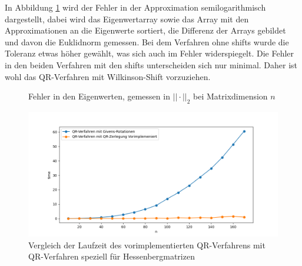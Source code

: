 \documentclass{article}
\theoremstyle{plain}
\begin{document}
In Abbildung \ref{Error_QR} wird der Fehler in der Approximation semilogarithmisch dargestellt, dabei wird das Eigenwertarray sowie das Array mit den Approximationen an die Eigenwerte sortiert, die Differenz der Arrays gebildet und davon die Euklidnorm gemessen. Bei dem Verfahren ohne shifts wurde die Toleranz etwas höher gewählt, was sich auch im Fehler widerspiegelt. Die Fehler in den beiden Verfahren mit den shifts unterscheiden sich nur minimal. Daher ist wohl das QR-Verfahren mit Wilkinson-Shift vorzuziehen.


\begin{figure}[H]
  \centering
  \qquad
  \caption{Fehler in den Eigenwerten, gemessen in $||\cdot||_2$ bei Matrixdimension $n$}%
  \label{Error_QR}
\end{figure}

\begin{figure}[H]
	\centering
	\includegraphics[width = 0.6\linewidth]{Plots/Laufzeitvergleich}
	\caption{Vergleich der Laufzeit des vorimplementierten QR-Verfahrens mit QR-Verfahren speziell für Hessenbergmatrizen}
	\label{Laufzeitvergleich}
\end{figure}
\end{document}
